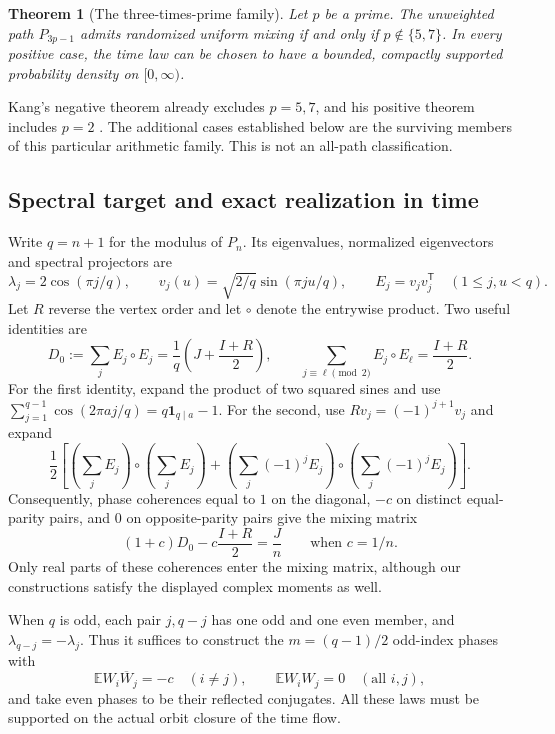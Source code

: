 \documentclass[11pt,a4paper]{article}
\newtheorem{theorem}{Theorem}[section]
\theoremstyle{definition}\newtheorem{definition}[theorem]{Definition}
\theoremstyle{remark}\newtheorem{remark}[theorem]{Remark}
\begin{document}
\begin{theorem}[The three-times-prime family]
\label{thm:three-prime-paths}
Let $p$ be a prime. The unweighted path $P_{3p-1}$ admits randomized
uniform mixing if and only if $p\notin\{5,7\}$. In every positive case,
the time law can be chosen to have a bounded, compactly supported
probability density on $[0,\infty)$.
\end{theorem}

Kang's negative theorem already excludes $p=5,7$, and his positive
theorem includes $p=2$ \cite{Kang2026}. The additional cases established
below are the surviving members of this particular arithmetic family.
This is not an all-path classification.

\subsection{Spectral target and exact realization in time}
Write $q=n+1$ for the modulus of $P_n$. Its eigenvalues, normalized
eigenvectors and spectral projectors are
\[
 \lambda_j=2\cos(\pi j/q),\qquad
 v_j(u)=\sqrt{2/q}\sin(\pi ju/q),\qquad
 E_j=v_jv_j^{\mathsf T}\quad(1\leq j,u<q).
\]
Let $R$ reverse the vertex order and let $\circ$ denote the entrywise
product. Two useful identities are
\begin{equation}\label{eq:new-path-spectral}
 D_0:=\sum_j E_j\circ E_j
 =\frac1q\left(J+\frac{I+R}{2}\right),\qquad
 \sum_{j\equiv\ell\pmod2}E_j\circ E_\ell=\frac{I+R}{2}.
\end{equation}
For the first identity, expand the product of two squared sines and use
\(\sum_{j=1}^{q-1}\cos(2\pi aj/q)=q\mathbf1_{q\mid a}-1\).
For the second, use $Rv_j=(-1)^{j+1}v_j$ and expand
\[
 \frac12\left[
 \left(\sum_jE_j\right)\circ\left(\sum_jE_j\right)
 +\left(\sum_j(-1)^jE_j\right)\circ
  \left(\sum_j(-1)^jE_j\right)\right].
\]
Consequently, phase coherences equal to $1$ on the diagonal, $-c$ on
distinct equal-parity pairs, and $0$ on opposite-parity pairs give the
mixing matrix
\begin{equation}\label{eq:new-path-target}
 (1+c)D_0-c\frac{I+R}{2}=\frac Jn\qquad\text{when }c=1/n.
\end{equation}
Only real parts of these coherences enter the mixing matrix, although
our constructions satisfy the displayed complex moments as well.

When $q$ is odd, each pair $j,q-j$ has one odd and one even member,
and $\lambda_{q-j}=-\lambda_j$. Thus it suffices to construct the
$m=(q-1)/2$ odd-index phases with
\begin{equation}\label{eq:new-odd-moments}
 \mathbb E W_i\overline W_j=-c\quad(i\ne j),\qquad
 \mathbb E W_iW_j=0\quad(\text{all }i,j),
\end{equation}
and take even phases to be their reflected conjugates. All these laws
must be supported on the actual orbit closure of the time flow.
\end{document}
